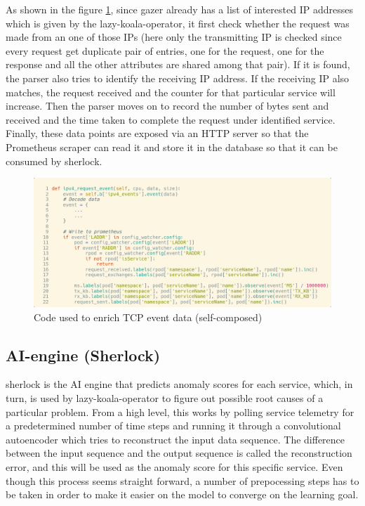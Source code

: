 As shown in the figure \ref{fig:gazer-enrich}, since \ac{gazer} already has a list of interested IP addresses which is given by the \ac{lazy-koala-operator}, it first check whether the request was made from an one of those IPs (here only the transmitting IP is checked since every request get duplicate pair of entries, one for the request, one for the response and all the other attributes are shared among that pair). If it is found, the parser also tries to identify the receiving IP address. If the receiving IP also matches, the request received and the counter for that particular service will increase. Then the parser moves on to record the number of bytes sent and received and the time taken to complete the request under identified service. Finally, these data points are exposed via an HTTP server so that the Prometheus scraper can read it and store it in the database so that it can be consumed by \ac{sherlock}.

\begin{figure}[H]
    \includegraphics[width=14cm]{assets/implementation/gazer-enrich.png}
    \caption{Code used to enrich TCP event data (self-composed)}
    \label{fig:gazer-enrich}
\end{figure}


\subsection{AI-engine (Sherlock)}

\ac{sherlock} is the AI engine that predicts anomaly scores for each service, which, in turn, is used by \ac{lazy-koala-operator} to figure out possible root causes of a particular problem. From a high level, this works by polling service telemetry for a predetermined number of time steps and running it through a convolutional autoencoder which tries to reconstruct the input data sequence. The difference between the input sequence and the output sequence is called the reconstruction error, and this will be used as the anomaly score for this specific service. Even though this process seems straight forward, a number of prepocessing steps has to be taken in order to make it easier on the model to converge on the learning goal.

